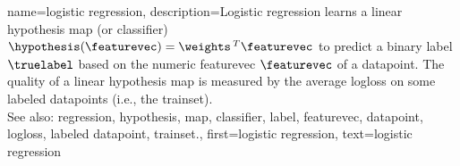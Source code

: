 {name={logistic regression}, 
	description={Logistic \gls{regression} learns a 
		linear \gls{hypothesis} \gls{map} (or \gls{classifier}) $\hypothesis(\featurevec) = \weights\,^{T} \featurevec$ 
		to predict a binary \gls{label} $\truelabel$ based on the numeric \gls{featurevec} $\featurevec$ of 
		a \gls{datapoint}. The quality of a linear \gls{hypothesis} \gls{map} is measured by the average \gls{logloss} 
		on some \glspl{labeled datapoint} (i.e., the \gls{trainset}).
				\\
		See also: \gls{regression}, \gls{hypothesis}, \gls{map}, \gls{classifier}, \gls{label}, \gls{featurevec}, \gls{datapoint}, \gls{logloss}, \gls{labeled datapoint}, \gls{trainset}.},
	first={logistic regression},
	text={logistic regression}
}
	
